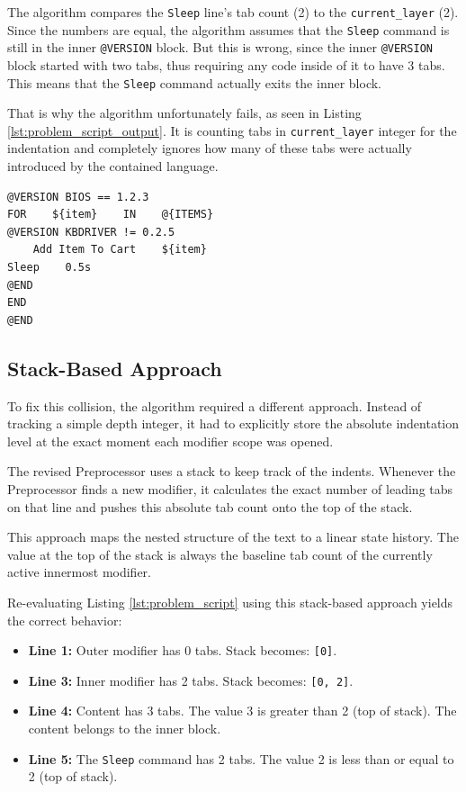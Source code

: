 The algorithm compares the \texttt{Sleep} line's tab count (2) to the \texttt{current\_layer} (2). Since the numbers are equal, the algorithm assumes that the \texttt{Sleep} command is still in the inner \texttt{@VERSION} block. But this is wrong, since the inner \texttt{@VERSION} block started with two tabs, thus requiring any code inside of it to have 3 tabs. This means that the \texttt{Sleep} command actually exits the inner block.

That is why the algorithm unfortunately fails, as seen in Listing \ref{lst:problem_script_output}. It is counting tabs in \texttt{current\_layer} integer for the indentation and completely ignores how many of these tabs were actually introduced by the contained language.

\begin{lstlisting}[caption={Wrong output of the problematic script with the first approach}, label={lst:problem_script_output}]
@VERSION BIOS == 1.2.3
FOR    ${item}    IN    @{ITEMS}
@VERSION KBDRIVER != 0.2.5
    Add Item To Cart    ${item}
Sleep    0.5s
@END
END
@END
\end{lstlisting}

\subsection{Stack-Based Approach}


To fix this collision, the algorithm required a different approach. Instead of tracking a simple depth integer, it had to explicitly store the absolute indentation level at the exact moment each modifier scope was opened. 

The revised Preprocessor uses a stack to keep track of the indents. Whenever the Preprocessor finds a new modifier, it calculates the exact number of leading tabs on that line and pushes this absolute tab count onto the top of the stack.


This approach maps the nested structure of the text to a linear state history. The value at the top of the stack is always the baseline tab count of the currently active innermost modifier.


Re-evaluating Listing \ref{lst:problem_script} using this stack-based approach yields the correct behavior:

\begin{itemize}

    \item \textbf{Line 1:} Outer modifier has 0 tabs. Stack becomes: \texttt{[0]}.

    \item \textbf{Line 3:} Inner modifier has 2 tabs. Stack becomes: \texttt{[0, 2]}.

    \item \textbf{Line 4:} Content has 3 tabs. The value 3 is greater than 2 (top of stack). The content belongs to the inner block.

    \item \textbf{Line 5:} The \texttt{Sleep} command has 2 tabs. The value 2 is less than or equal to 2 (top of stack). 

\end{itemize}

